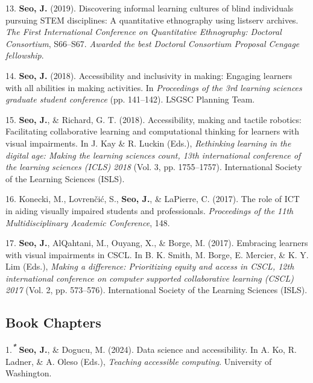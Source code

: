 \documentclass[11pt,a4paper,]{awesome-cv}
\newlength{\cslhangindent}
\newenvironment{CSLReferences}[2] %
 {\begin{list}{}{%
  \setlength{\itemindent}{0pt}
  \setlength{\leftmargin}{0pt}
  \setlength{\parsep}{0pt}
  \ifodd #1
   \setlength{\leftmargin}{\cslhangindent}
   \setlength{\itemindent}{-1\cslhangindent}
  \fi
  \setlength{\itemsep}{#2\baselineskip}}}
 {\end{list}}
\begin{document}
\begin{CSLReferences}{1}{0}
13. \textbf{Seo, J.} (2019). Discovering informal learning cultures of
blind individuals pursuing STEM disciplines: A quantitative ethnography
using listserv archives. \emph{The First International Conference on
Quantitative Ethnography: Doctoral Consortium}, S66--S67. \emph{Awarded
the best Doctoral Consortium Proposal Cengage fellowship}.

14. \textbf{Seo, J.} (2018). Accessibility and inclusivity in making:
Engaging learners with all abilities in making activities. In
\emph{Proceedings of the 3rd learning sciences graduate student
conference} (pp. 141--142). LSGSC Planning Team.

15. \textbf{Seo, J.}, \& Richard, G. T. (2018). Accessibility, making
and tactile robotics: Facilitating collaborative learning and
computational thinking for learners with visual impairments. In J. Kay
\& R. Luckin (Eds.), \emph{Rethinking learning in the digital age:
Making the learning sciences count, 13th international conference of the
learning sciences (ICLS) 2018} (Vol. 3, pp. 1755--1757). International
Society of the Learning Sciences (ISLS).

16. Konecki, M., Lovrenčić, S., \textbf{Seo, J.}, \& LaPierre, C.
(2017). The role of ICT in aiding visually impaired students and
professionals. \emph{Proceedings of the 11th Multidisciplinary Academic
Conference}, 148.

17. \textbf{Seo, J.}, AlQahtani, M., Ouyang, X., \& Borge, M. (2017).
Embracing learners with visual impairments in CSCL. In B. K. Smith, M.
Borge, E. Mercier, \& K. Y. Lim (Eds.), \emph{Making a difference:
Prioritizing equity and access in CSCL, 12th international conference on
computer supported collaborative learning (CSCL) 2017} (Vol. 2, pp.
573--576). International Society of the Learning Sciences (ISLS).

\end{CSLReferences}

\subsection{Book Chapters}\label{book-chapters}

\label{refs-20571be9e60cca0b4f6994e8763d6b1d}
\begin{CSLReferences}{1}{0}
1.\textsuperscript{\textbf{\emph{*}}} \textbf{Seo, J.}, \& Dogucu, M.
(2024). Data science and accessibility. In A. Ko, R. Ladner, \& A. Oleso
(Eds.), \emph{Teaching accessible computing}. University of Washington.

\end{CSLReferences}
\end{document}
